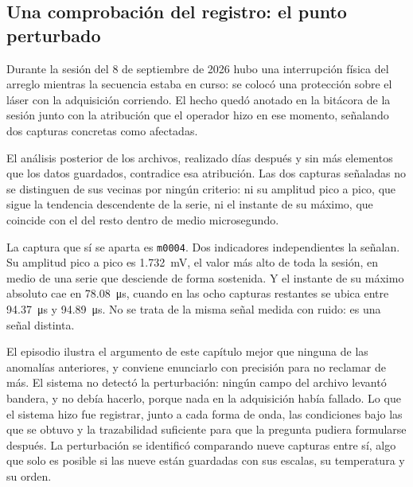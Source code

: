 
\subsection{Una comprobación del registro: el punto perturbado}
\label{sec:registro_corrige}

Durante la sesión del 8 de septiembre de 2026 hubo una interrupción
física del arreglo mientras la secuencia estaba en curso: se colocó una
protección sobre el láser con la adquisición corriendo. El hecho quedó
anotado en la bitácora de la sesión junto con la atribución que el
operador hizo en ese momento, señalando dos capturas concretas como
afectadas.

El análisis posterior de los archivos, realizado días después y
sin más elementos que los datos guardados, contradice esa atribución.
Las dos capturas señaladas no se distinguen de sus vecinas por ningún
criterio: ni su amplitud pico a pico, que sigue la tendencia
descendente de la serie, ni el instante de su máximo, que coincide con
el del resto dentro de medio microsegundo.

La captura que sí se aparta es \texttt{m0004}. Dos indicadores
independientes la señalan. Su amplitud pico a pico es
\SI{1.732}{\milli\volt}, el valor más alto de toda la sesión, en medio
de una serie que desciende de forma sostenida. Y el instante de su
máximo absoluto cae en \SI{78.08}{\micro\second}, cuando en las ocho
capturas restantes se ubica entre \SI{94.37}{\micro\second} y
\SI{94.89}{\micro\second}. No se trata de la misma señal medida con
ruido: es una señal distinta.

El episodio ilustra el argumento de este capítulo mejor que ninguna de
las anomalías anteriores, y conviene enunciarlo con precisión para no
reclamar de más. El sistema no detectó la perturbación: ningún campo
del archivo levantó bandera, y no debía hacerlo, porque nada en la
adquisición había fallado. Lo que el sistema hizo fue registrar, junto
a cada forma de onda, las condiciones bajo las que se obtuvo y la
trazabilidad suficiente para que la pregunta pudiera formularse
después. La perturbación se identificó comparando nueve capturas entre
sí, algo que solo es posible si las nueve están guardadas con sus
escalas, su temperatura y su orden.

